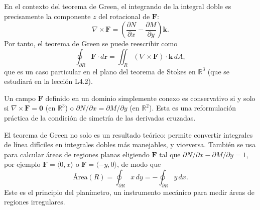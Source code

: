 En el contexto del teorema de Green, el integrando de la integral doble
es precisamente la componente $z$ del rotacional de $\mathbf{F}$:
\[
\nabla \times \mathbf{F} = \left( \frac{\partial N}{\partial x}
- \frac{\partial M}{\partial y} \right) \mathbf{k}.
\]
Por tanto, el teorema de Green se puede reescribir como
\[
\oint_{\partial R} \mathbf{F} \cdot d\mathbf{r}
= \iint_R (\nabla \times \mathbf{F}) \cdot \mathbf{k} \, dA,
\]
que es un caso particular en el plano del teorema de Stokes en
$\mathbb{R}^3$ (que se estudiará en la lección L4.2).

\begin{rem}
Un campo $\mathbf{F}$ definido en un dominio simplemente conexo es
conservativo si y solo si $\nabla \times \mathbf{F} = \mathbf{0}$
(en $\mathbb{R}^3$) o $\partial N/\partial x = \partial M/\partial y$
(en $\mathbb{R}^2$). Esta es una reformulación práctica de la condición
de simetría de las derivadas cruzadas.
\end{rem}

\begin{rem}
El teorema de Green no solo es un resultado teórico: permite convertir
integrales de línea difíciles en integrales dobles más manejables, y
viceversa. También se usa para calcular áreas de regiones planas
eligiendo $\mathbf{F}$ tal que $\partial N/\partial x - \partial
M/\partial y = 1$, por ejemplo $\mathbf{F} = \langle 0, x \rangle$ o
$\mathbf{F} = \langle -y, 0 \rangle$, de modo que
\[
\text{Área}(R) = \oint_{\partial R} x\,dy = -\oint_{\partial R} y\,dx.
\]
Este es el principio del planímetro, un instrumento mecánico para medir
áreas de regiones irregulares.
\end{rem}

